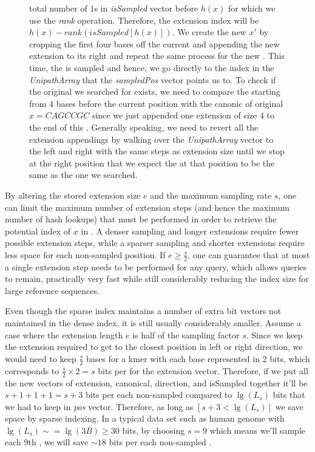 \begin{figure}
{  total number of $1$s in \emph{isSampled} vector before $h(x)$ for which we use the
  \emph{rank} operation. Therefore, the extension index will be $h(x)-rank(isSampled[h(x)])$.
  We create the new \kmer $x'$ by cropping the first four bases off the current \kmer and
  appending the new extension to its right and repeat the same process for the new \kmer.
  This time, the \kmer is sampled and hence, we go directly to the index in the \emph{UnipathArray}
  that the \emph{sampledPos} vector points us to. To check if the original \kmer we searched for
  exists, we need to compare the \kmer starting from $4$ bases before the current position 
  with the canonic of original \kmer $x=CAGCCGC$ since we just appended one extension of size 4
  to the end of this \kmer. Generally speaking, we need to revert all the extension appendings 
  by walking over the \emph{UnipathArray} vector to the left and right with the same steps as
  extension size until we stop at the right position that we expect the \kmer at that position to be the
  same as the one we searched.}
\label{fig:sparse_query}
\end{figure}



By altering the stored extension size $e$ and the maximum sampling rate $s$, one
can limit the maximum number of extension steps (and hence the maximum number of
hash lookups) that must be performed in order to retrieve the potential index of
$x$ in \cseq. A denser sampling and longer extensions require fewer possible
extension steps, while a sparser sampling and shorter extensions require less space
for each non-sampled position. If $e \geq \frac{s}{2}$, one can guarantee that
at most a single extension step needs to be performed for any \kmer query, which
allows \kmer queries to remain, practically very fast while still considerably
reducing the index size for large reference sequences.

Even though the sparse index maintains a number of extra bit vectors not maintained
in the dense index, it is still usually considerably smaller.
Assume a case where the extension length $e$ is half of the sampling factor $s$.
Since we keep the extension required to get to 
the closest position in left or right direction, we would need to keep
$\frac{s}{2}$ bases for a kmer with each base represented in 2 bits, which corresponds to 
$\frac{s}{2}\times 2 = s$ bits per \kmer for the extension vector. Therefore, if we put all the new 
vectors of extension, canonical, direction, and isSampled together it'll be $s+1+1+1=s+3$ bits 
per each non-sampled \kmer compared to $\lg(L_s)$ bits that we had to keep in 
\emph{pos} vector. Therefore, as long as $[s+3< \lg(L_s)]$ we save space by sparse indexing.
In a typical data set such as human genome with $\lg(L_s) \sim= \lg(3B) \geq 30$ bits, by choosing
$s=9$ which means we'll sample each 9th \kmer, we will save $\sim18$ bits per each non-sampled \kmer.

